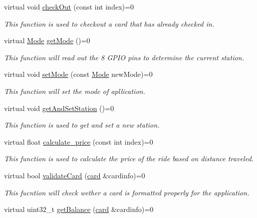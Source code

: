 \begin{DoxyCompactItemize}
virtual void \hyperlink{classovTracker_a96e808776b864290f742f271e18c401c}{check\+Out} (const int index)=0
\begin{DoxyCompactList}\small\item\em This function is used to checkout a card that has already checked in. \end{DoxyCompactList}\item 
virtual \hyperlink{stations_8h_ad03936209251465257e0fdcfb33dbf91}{Mode} \hyperlink{classovTracker_afda6f161dc45106e43fc5031916fd91a}{get\+Mode} ()=0
\begin{DoxyCompactList}\small\item\em This function will read out the 8 G\+P\+IO pins to determine the current station. \end{DoxyCompactList}\item 
virtual void \hyperlink{classovTracker_a776f469f9db184664e4f4425cca2df32}{set\+Mode} (const \hyperlink{stations_8h_ad03936209251465257e0fdcfb33dbf91}{Mode} new\+Mode)=0
\begin{DoxyCompactList}\small\item\em This function will set the mode of apllication. \end{DoxyCompactList}\item 
virtual void \hyperlink{classovTracker_ae570f702740648f2994a0159616fa763}{get\+And\+Set\+Station} ()=0
\begin{DoxyCompactList}\small\item\em This function is used to get and set a new station. \end{DoxyCompactList}\item 
virtual float \hyperlink{classovTracker_ad50a46fc20404df988d477f5525ae9d9}{calculate\+\_\+price} (const int index)=0
\begin{DoxyCompactList}\small\item\em This function is used to calculate the price of the ride based on distance traveled. \end{DoxyCompactList}\item 
virtual bool \hyperlink{classovTracker_a793048db1b73e4e36a0cf11839048f73}{validate\+Card} (\hyperlink{classcard}{card} \&cardinfo)=0
\begin{DoxyCompactList}\small\item\em This fucntion will check wether a card is formatted properly for the application. \end{DoxyCompactList}\item 
virtual uint32\+\_\+t \hyperlink{classovTracker_a9bcfc435593679ec503a48da21d7a5a0}{get\+Balance} (\hyperlink{classcard}{card} \&cardinfo)=0

\end{DoxyCompactItemize}
